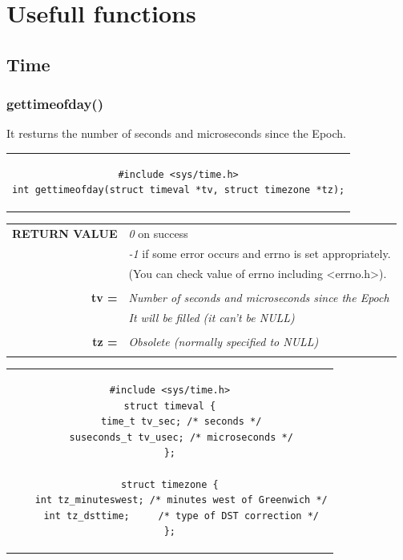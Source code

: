 \section{Usefull functions}
\subsection{Time}
\subsubsection{gettimeofday()}
It resturns the number of seconds and microseconds since the Epoch.
\begin{center}
\begin{tabular}{c}
\begin{lstlisting}[linewidth=300pt, basicstyle=\footnotesize\sffamily,]
#include <sys/time.h>
int gettimeofday(struct timeval *tv, struct timezone *tz);
\end{lstlisting}
\end{tabular}
\end{center}

\begin{table}[H]
\centering\footnotesize
\begin{tabular}{rl}
\textbf{RETURN VALUE} & {\textit{0} on success}\\
{} & {\textit{-1} if some error occurs and errno is set appropriately.}\\
{} & {(You can check value of errno including <errno.h>).}\\
& \\
\textbf{tv =} & {\textit{Number of seconds and microseconds since the Epoch}}\\
{} & {\textit{It will be filled (it can't be NULL)}}\\
& \\
\textbf{tz =} & {\textit{Obsolete (normally specified to NULL)}}\\
&\\
\end{tabular}
\end{table}

\begin{center}
\begin{tabular}{c}
\begin{lstlisting}[linewidth=270pt, basicstyle=\footnotesize\sffamily,]
#include <sys/time.h>
struct timeval {
	time_t tv_sec; /* seconds */
	suseconds_t tv_usec; /* microseconds */
};

struct timezone {
	int tz_minuteswest; /* minutes west of Greenwich */
	int tz_dsttime;     /* type of DST correction */
};
\end{lstlisting}
\end{tabular}
\end{center}
\vspace{4cm}
